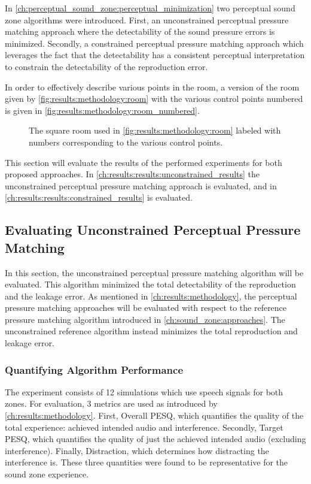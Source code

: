 In \autoref{ch:perceptual_sound_zone:perceptual_minimization} two perceptual sound zone algorithms were introduced. 
First, an unconstrained perceptual pressure matching approach where the detectability of the sound pressure errors is minimized.
Secondly, a constrained perceptual pressure matching approach which leverages the fact that the detectability has a consistent 
perceptual interpretation to constrain the detectability of the reproduction error.

In order to effectively describe various points in the room, a version of the room given by \autoref{fig:results:methodology:room}
with the various control points numbered is given in \autoref{fig:results:methodology:room_numbered}.

\begin{figure}[]
    \centering
    \scalebox{1.0}{}
    \caption{The square room used in \autoref{fig:results:methodology:room} labeled with numbers corresponding to the various control points.}
    \label{fig:results:methodology:room_numbered}
\end{figure}

This section will evaluate the results of the performed experiments for both proposed approaches.
In \autoref{ch:results:results:unconstrained_results} the unconstrained perceptual pressure matching approach is evaluated, and 
in \autoref{ch:results:results:constrained_results} is evaluated.

\subsection{Evaluating Unconstrained Perceptual Pressure Matching}
\label{ch:results:results:unconstrained_results}
In this section, the unconstrained perceptual pressure matching algorithm will be evaluated.
This algorithm minimized the total detectability of the reproduction and the leakage error.
As mentioned in \autoref{ch:results:methodology}, the perceptual pressure matching approaches will be evaluated with respect to the 
reference pressure matching algorithm introduced in \autoref{ch:sound_zone:approaches}.
The unconstrained reference algorithm instead minimizes the total reproduction and leakage error.

\subsubsection*{Quantifying Algorithm Performance}
The experiment consists of 12 simulations which use speech signals for both zones.
For evaluation, 3 metrics are used as introduced by \autoref{ch:results:methodology}.
First, Overall PESQ, which quantifies the quality of the total experience: achieved intended audio and interference.
Secondly, Target PESQ, which quantifies the quality of just the achieved intended audio (excluding interference).
Finally, Distraction, which determines how distracting the interference is.
These three quantities were found to be representative for the sound zone experience.

